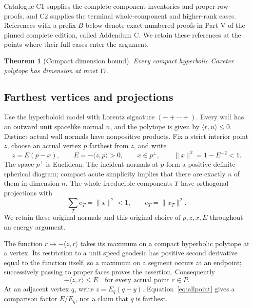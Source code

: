 \documentclass[11pt]{article}
\newtheorem{theorem}{Theorem}[section]
\theoremstyle{remark}\newtheorem{remark}[theorem]{Remark}
\numberwithin{equation}{section}
\newcommand{\ip}[2]{\langle #1,#2\rangle}
\newcommand{\norm}[1]{\lVert #1\rVert}
\begin{document}
Catalogue C1 supplies the complete component inventories and proper-row
proofs, and C2 supplies the terminal whole-component and higher-rank cases.
References with a prefix $B$ below denote exact numbered proofs in Part V
of the pinned complete edition, called Addendum C. We retain these
references at the points where their full cases enter the argument.

\begin{theorem}[Compact dimension bound]\label{compact:thm:main}
Every compact hyperbolic Coxeter polytope has dimension at most $17$.
\end{theorem}

\subsection{Farthest vertices and projections}
\label{compact:sec:geometry}
Use the hyperboloid model with Lorentz signature \((-+\cdots+)\).
Every wall has an outward unit spacelike normal \(n\), and the polytope
is given by \(\ip{r}{n}\leq0\). Distinct actual wall normals have
nonpositive products. Fix a strict interior point \(z\), choose an
actual vertex \(p\) farthest from \(z\), and write
 \begin{equation}
\label{eq:original}z=E(p-x),\qquad E=-\ip{z}{p}>0,\qquad
 x\in p^\perp,\qquad \norm{x}^{2}=1-E^{-2}<1.
\end{equation}
The space \(p^\perp\) is Euclidean. The incident normals at \(p\) form
a positive definite spherical diagram; compact acute simplicity
implies that there are exactly \(n\) of them in dimension \(n\).
The whole irreducible components $T$ have orthogonal projections with
\begin{equation}\label{eq:energy}
 \sum_T e_T=\norm{x}^2<1,\qquad e_T=\norm{x_T}^2.
\end{equation}
We retain these original normals and this original choice of
 \(p,z,x,E\) throughout an energy argument.

The function \(r\mapsto-\ip{z}{r}\) takes its maximum on a compact
hyperbolic polytope at a vertex. Its restriction to a unit speed
geodesic has positive second derivative equal to the function itself,
so a maximum on a segment occurs at an endpoint; successively
passing to proper faces proves the assertion. Consequently
 \begin{equation}
\label{eq:allpoint}-\ip{z}{r}\leq E\quad\text{for every actual point }r\in P.
\end{equation}
At an adjacent vertex \(q\), write \(z=E_q(q-y)\).
Equation~\eqref{eq:allpoint} gives a comparison factor \(E/E_q\),
not a claim that \(q\) is farthest.
\end{document}
